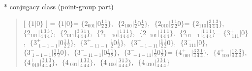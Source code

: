 \documentclass[fleqn,10pt,landscape]{jsarticle}
\begin{document}
* conjugacy class (point-group part)
\begin{quote}
[ $\{1|0\}$ ] = \quad $\{1|0\}$ = \quad $\{2{}_{001}|0 \frac{1}{2} \frac{1}{2}\}$,\,\, $\{2{}_{100}|\frac{1}{2} 0 \frac{1}{2}\}$,\,\, $\{2{}_{010}|\frac{1}{2} \frac{1}{2} 0\}$ = \quad $\{2{}_{110}|\frac{3}{4} \frac{1}{4} \frac{3}{4}\}$,\,\, $\{2{}_{101}|\frac{1}{4} \frac{3}{4} \frac{3}{4}\}$,\,\, $\{2{}_{011}|\frac{3}{4} \frac{3}{4} \frac{1}{4}\}$,\,\, $\{2{}_{1-10}|\frac{1}{4} \frac{1}{4} \frac{1}{4}\}$,\,\, $\{2{}_{-101}|\frac{1}{4} \frac{1}{4} \frac{1}{4}\}$,\,\, $\{2{}_{01-1}|\frac{1}{4} \frac{1}{4} \frac{1}{4}\}$\newline[ $\{3^{+}_{\,\,111}|0\}$ ] = \quad $\{3^{+}_{\,\,111}|0\}$,\,\, $\{3^{+}_{\,\,1-1-1}|0 \frac{1}{2} \frac{1}{2}\}$,\,\, $\{3^{+}_{\,\,-11-1}|\frac{1}{2} 0 \frac{1}{2}\}$,\,\, $\{3^{+}_{\,\,-1-11}|\frac{1}{2} \frac{1}{2} 0\}$,\,\, $\{3^{-}_{\,\,111}|0\}$,\,\, $\{3^{-}_{\,\,1-1-1}|\frac{1}{2} \frac{1}{2} 0\}$,\,\, $\{3^{-}_{\,\,-11-1}|0 \frac{1}{2} \frac{1}{2}\}$,\,\, $\{3^{-}_{\,\,-1-11}|\frac{1}{2} 0 \frac{1}{2}\}$ = \quad $\{4^{+}_{\,\,001}|\frac{3}{4} \frac{3}{4} \frac{1}{4}\}$,\,\, $\{4^{+}_{\,\,100}|\frac{1}{4} \frac{3}{4} \frac{3}{4}\}$,\,\, $\{4^{+}_{\,\,010}|\frac{3}{4} \frac{1}{4} \frac{3}{4}\}$,\,\, $\{4^{-}_{\,\,001}|\frac{1}{4} \frac{3}{4} \frac{3}{4}\}$,\,\, $\{4^{-}_{\,\,100}|\frac{3}{4} \frac{1}{4} \frac{3}{4}\}$,\,\, $\{4^{-}_{\,\,010}|\frac{3}{4} \frac{3}{4} \frac{1}{4}\}$\newline
\end{quote}
\end{document}
